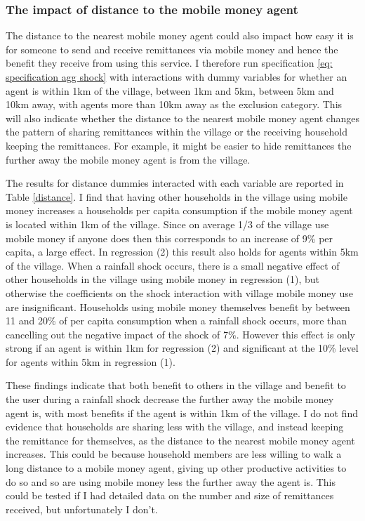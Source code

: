 \subsubsection{The impact of distance to the mobile money agent}
The distance to the nearest mobile money agent could also impact how easy it is for someone to send and receive remittances via mobile money and hence the benefit they receive from using this service. I therefore run specification \eqref{eq: specification agg shock} with interactions with dummy variables for whether an agent is within 1km of the village, between 1km and 5km, between 5km and 10km away, with agents more than 10km away as the exclusion category. This will also indicate whether the distance to the nearest mobile money agent changes the pattern of sharing remittances within the village or the receiving household keeping the remittances. For example, it might be easier to hide remittances the further away the mobile money agent is from the village. 

The results for distance dummies interacted with each variable are reported in Table \ref{distance}. I find that having other households in the village using mobile money increases a households per capita consumption if the mobile money agent is located within 1km of the village. Since on average 1/3 of the village use mobile money if anyone does then this corresponds to an increase of 9\% per capita, a large effect. In regression (2) this result also holds for agents within 5km of the village. When a rainfall shock occurs, there is a small negative effect of other households in the village using mobile money in regression (1), but otherwise the coefficients on the shock interaction with village mobile money use are insignificant. Households using mobile money themselves benefit by between 11 and 20\% of per capita consumption when a rainfall shock occurs, more than cancelling out the negative impact of the shock of 7\%. However this effect is only strong if an agent is within 1km for regression (2) and significant at the 10\% level for agents within 5km in regression (1). 

These findings indicate that both benefit to others in the village and benefit to the user during a rainfall shock decrease the further away the mobile money agent is, with most benefits if the agent is within 1km of the village. I do not find evidence that households are sharing less with the village, and instead keeping the remittance for themselves, as the distance to the nearest mobile money agent increases. This could be because household members are less willing to walk a long distance to a mobile money agent, giving up other productive activities to do so and so are using mobile money less the further away the agent is. This could be tested if I had detailed data on the number and size of remittances received, but unfortunately I don't.   


